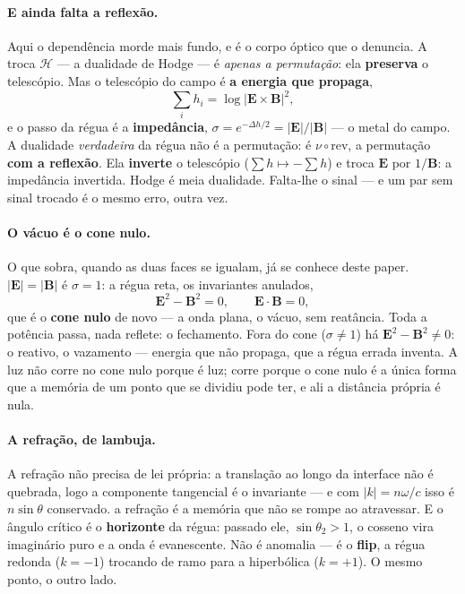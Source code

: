 \documentclass[11pt]{article}
\theoremstyle{plain}
\theoremstyle{remark}
\begin{document}
\paragraph{E ainda falta a reflexão.} Aqui o dependência morde mais fundo, e é o corpo
óptico que o denuncia. A troca $\mathcal{H}$ --- a dualidade de Hodge --- é
\emph{apenas a permutação}: ela \textbf{preserva} o telescópio. Mas o telescópio do
campo é \textbf{a energia que propaga},
\[
\textstyle\sum_i h_i=\log\lvert\mathbf{E}\times\mathbf{B}\rvert^{2},
\]
e o passo da régua é a \textbf{impedância}, $\sigma=e^{-\Delta h/2}=\lvert
\mathbf{E}\rvert/\lvert\mathbf{B}\rvert$ --- o metal do campo. A dualidade
\emph{verdadeira} da régua não é a permutação: é $\nu\circ\mathrm{rev}$, a permutação
\textbf{com a reflexão}. Ela \textbf{inverte} o telescópio ($\sum h\mapsto-\sum h$) e
troca $\mathbf{E}$ por $1/\mathbf{B}$: a impedância invertida. Hodge é meia
dualidade. Falta-lhe o sinal --- e um par sem sinal trocado é o mesmo erro,
outra vez.

\paragraph{O vácuo é o cone nulo.} O que sobra, quando as duas faces se igualam,
já se conhece deste paper. $\lvert\mathbf{E}\rvert=\lvert\mathbf{B}\rvert$ é
$\sigma=1$: a régua reta, os invariantes anulados,
\[
\mathbf{E}^{2}-\mathbf{B}^{2}=0,\qquad \mathbf{E}\cdot\mathbf{B}=0,
\]
que é o \textbf{cone nulo} de novo --- a onda plana, o vácuo, sem reatância. Toda a
potência passa, nada reflete: o fechamento. Fora do cone ($\sigma\neq1$) há
$\mathbf{E}^{2}-\mathbf{B}^{2}\neq0$: o reativo, o vazamento --- energia que não
propaga, que a régua errada inventa. A luz não corre no cone nulo porque é luz;
corre porque o cone nulo é a única forma que a memória de um ponto que se dividiu
pode ter, e ali a distância própria é nula.

\paragraph{A refração, de lambuja.} A refração não precisa de lei própria: a translação ao
longo da interface não é quebrada, logo a componente tangencial é o invariante --- e
com $\lvert k\rvert=n\omega/c$ isso é $n\sin\theta$ conservado. a refração é a memória que
não se rompe ao atravessar. E o ângulo crítico é o \textbf{horizonte} da régua:
passado ele, $\sin\theta_2>1$, o cosseno vira imaginário puro e a onda é evanescente.
Não é anomalia --- é o \textbf{flip}, a régua redonda ($k=-1$) trocando de
ramo para a hiperbólica ($k=+1$). O mesmo ponto, o outro lado.
\end{document}
